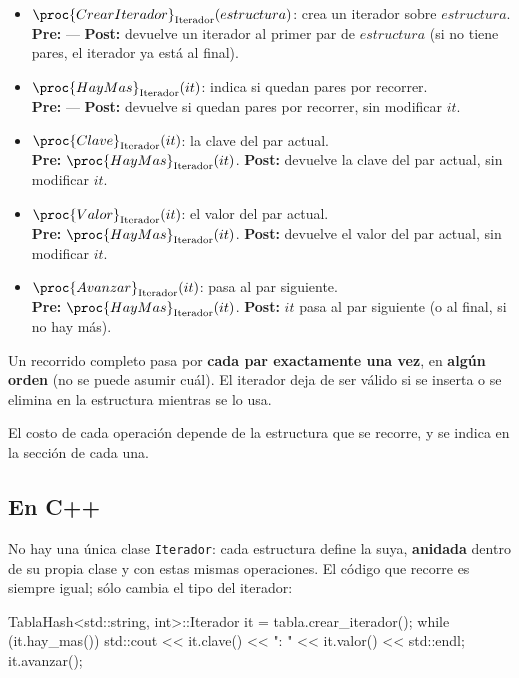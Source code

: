 \documentclass{article}
\newcommand{\OP}[2]{\proc{#1}_{\text{#2}}}
\begin{document}
\begin{itemize}
\item $\OP{CrearIterador}{Iterador}(estructura)$: crea un iterador sobre $estructura$. \\
  {\footnotesize \textbf{Pre:} --- \quad \textbf{Post:} devuelve un iterador al primer par de $estructura$ (si no tiene pares, el iterador ya está al final).}
\item $\OP{HayMas}{Iterador}(it)$: indica si quedan pares por recorrer. \\
  {\footnotesize \textbf{Pre:} --- \quad \textbf{Post:} devuelve si quedan pares por recorrer, sin modificar $it$.}
\item $\OP{Clave}{Iterador}(it)$: la clave del par actual. \\
  {\footnotesize \textbf{Pre:} $\OP{HayMas}{Iterador}(it)$. \quad \textbf{Post:} devuelve la clave del par actual, sin modificar $it$.}
\item $\OP{Valor}{Iterador}(it)$: el valor del par actual. \\
  {\footnotesize \textbf{Pre:} $\OP{HayMas}{Iterador}(it)$. \quad \textbf{Post:} devuelve el valor del par actual, sin modificar $it$.}
\item $\OP{Avanzar}{Iterador}(it)$: pasa al par siguiente. \\
  {\footnotesize \textbf{Pre:} $\OP{HayMas}{Iterador}(it)$. \quad \textbf{Post:} $it$ pasa al par siguiente (o al final, si no hay más).}
\end{itemize}

Un recorrido completo pasa por \textbf{cada par exactamente una vez}, en
\textbf{algún orden} (no se puede asumir cuál). El iterador deja de ser
válido si se inserta o se elimina en la estructura mientras se lo usa.

El costo de cada operación depende de la estructura que se recorre, y
se indica en la sección de cada una.

\subsection{En C++}

No hay una única clase \texttt{Iterador}: cada estructura define la
suya, \textbf{anidada} dentro de su propia clase y con estas mismas
operaciones. El código que recorre es siempre igual; sólo cambia el tipo
del iterador:

\begin{cppcode}
TablaHash<std::string, int>::Iterador it = tabla.crear_iterador();
while (it.hay_mas()) {
    std::cout << it.clave() << ": " << it.valor() << std::endl;
    it.avanzar();
}
\end{cppcode}
\end{document}
